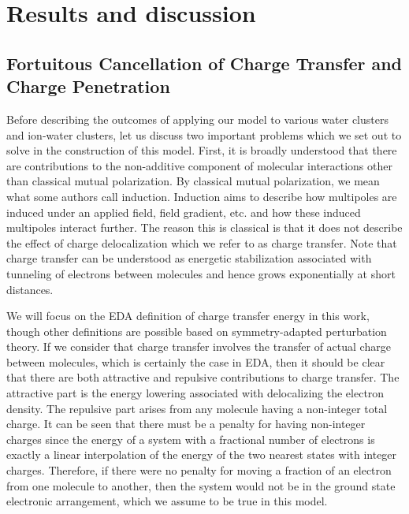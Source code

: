 \documentclass[journal=jacsat,manuscript=article]{achemso}
\begin{document}
\section*{Results and discussion}
\subsection*{Fortuitous Cancellation of Charge Transfer and Charge Penetration}

Before describing the outcomes of applying our model to various water clusters and
ion-water clusters, let us discuss two important problems which we set out to solve
in the construction of this model. First, it is broadly understood that there are
contributions to the non-additive component of molecular interactions other than
classical mutual polarization. By classical mutual polarization, we mean what some
authors call induction.\cite{herman2023accurate} Induction aims to describe
how multipoles are induced under an applied field, field gradient, etc.
and how these induced multipoles interact further. The reason this is classical
is that it does not describe the effect of charge delocalization which we refer to
as charge transfer. Note that charge transfer can be understood as energetic
stabilization associated with tunneling of electrons between molecules
and hence grows exponentially at short distances.\cite{misquitta2013charge}

We will focus on the EDA definition of charge transfer energy in this work, though
other definitions are possible based on symmetry-adapted perturbation theory.\cite{stone2009charge,misquitta2013charge}
If we consider that charge transfer involves the transfer of actual charge between
molecules, which is certainly the case in EDA\cite{thirman2018characterizing},
then it should be clear that there are both attractive and repulsive contributions
to charge transfer. The attractive part is the energy lowering associated with delocalizing
the electron density. The repulsive part arises from any molecule having a non-integer
total charge. It can be seen that there must be a penalty for having non-integer
charges since the energy of a system with a fractional number of electrons is exactly
a linear interpolation of the energy of the two nearest states with integer charges.\cite{perdew1982density}
Therefore, if there were no penalty for moving a fraction of an electron from one molecule to another,
then the system would not be in the ground state electronic arrangement, which we
assume to be true in this model.
\end{document}
